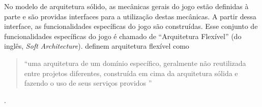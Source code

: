 No modelo de arquitetura sólido, as mecânicas gerais do jogo estão definidas à parte e são providas interfaces para a utilização destas mecânicas. A partir dessa interface, as funcionalidades específicas do jogo são construídas. Esse conjunto de funcionalidades específicas do jogo é chamado de “Arquitetura Flexível” (do inglês, \textit{Soft Architecture}).  definem arquitetura flexível como \begin{quote} ``uma arquitetura de um domínio específico, geralmente não reutilizada entre projetos diferentes, construída em cima da arquitetura sólida e fazendo o uso de seus serviços providos ''\end{quote}.
